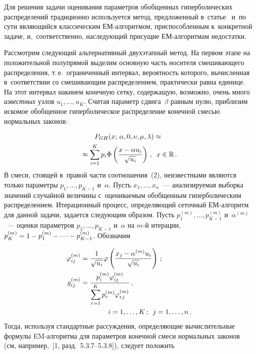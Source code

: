 \begin{multicols}{2}
Для решения задачи оценивания параметров обобщенных гиперболических
распределений традиционно используется метод, предложенный в~статье~\cite{p2004}
и~по сути являющийся классическим ЕМ-ал\-го\-рит\-мом,
приспособленным к~конкретной задаче, и,~соответственно, наследующий
присущие ЕМ-ал\-го\-рит\-мам недостатки.

Рассмотрим следующий альтернативный двухэтапный метод. На первом
этапе на поло\-жи\-тельной полупрямой выделим основную часть носителя
смешивающего распределения, т.\,е.\ \mbox{ограниченный} интервал,
вероятность которого, вычисленная в~соответствии со смешивающим
распределением, практически равна единице. На этот интервал накинем
конечную сетку, содержащую, возможно, очень много {\it известных}
узлов $u_1,\ldots,u_K$. Считая параметр сдвига~$\beta$ равным нулю,
приблизим искомое обобщенное гиперболическое распределение конечной
смесью нормальных законов:

\noindent
\begin{multline}
P_{GH}(x;\,\alpha,0,\nu,\mu,\lambda)\approx{}\\
{}\approx \sum\limits_{i=1}^K
p_i\Phi\left(\displaystyle\frac{\displaystyle x-\alpha u_i\mathstrut}{\displaystyle \sqrt{u_i}\mathstrut}\right)\,,\enskip
x\in\mathbb{R}\,.\label{e2-kor}
\end{multline}
В смеси, стоящей в~правой части соотношения~(2), неизвестными
являются только параметры $p_1,\ldots,p_{K-1}$ и~$\alpha$. Пусть
$x_1,\ldots,x_n$~--- анализируемая выборка значений случайной
величины с~оцениваемым обобщенным гиперболическим распределением.
Итерационный процесс, определяющий сеточный ЕМ-ал\-го\-ритм для данной
задачи, задается следующим образом. Пусть
$p_1^{(m)},\ldots,p_{K-1}^{(m)}$ и~$\alpha^{(m)}$~--- оценки параметров
$p_1,\ldots,p_{K-1}$ и~$\alpha$ на $m$-й итерации,
$p_K^{(m)}\hm=1\hm-p_1^{(m)}-\cdots-p_{K-1}^{(m)}$. Обозначим

\noindent
\begin{align*}
\varphi_{ij}^{(m)}&=\fr{1}{\sqrt{u_i}}\varphi\left(\fr{x_j-\alpha^{(m)}u_i}{\sqrt{u_i}}\right)\,;
\\
g_{ij}^{(m)}&=\fr{p_i^{(m)}\varphi_{ij}^{(m)}}{\sum\limits_{r=1}^K
p_r^{(m)}\varphi_{rj}^{(m)}}\,,\\
&\hspace*{14mm}i=1,\ldots,K\,;\enskip j=1,\ldots,n\,.
\end{align*}
Тогда, используя стандартные рассуждения, определяющие
вычислительные формулы EM-ал\-го\-рит\-ма для параметров конечной смеси
нормальных законов (см, например,~[1, разд.~5.3.7--5.3.8]),
следует положить


\end{multicols}
